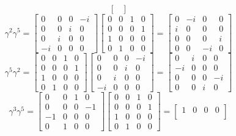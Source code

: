 \documentclass{article}
\begin{document}
\begin{flushleft}
$$\begin{bmatrix}
\end{bmatrix}
$$
$$
\gamma^{2} \gamma^{5}=\begin{bmatrix}
0 & 0 & 0 & -i \\
0 & 0 & i & 0 \\
0 & i & 0 & 0 \\
-i & 0 & 0 & 0
\end{bmatrix}\begin{bmatrix}
0 & 0 & 1 & 0 \\
0 & 0 & 0 & 1 \\
1 & 0 & 0 & 0 \\
0 & 1 & 0 & 0
\end{bmatrix}=\begin{bmatrix}
0 & -i & 0 & 0 \\
i & 0 & 0 & 0 \\
0 & 0 & 0 & i \\
0 & 0 & -i & 0
\end{bmatrix}
$$
$$
\gamma^{5} \gamma^{2}=\begin{bmatrix}
0 & 0 & 1 & 0 \\
0 & 0 & 0 & 1 \\
1 & 0 & 0 & 0 \\
0 & 1 & 0 & 0
\end{bmatrix}\begin{bmatrix}
0 & 0 & 0 & -i \\
0 & 0 & i & 0 \\
0 & i & 0 & 0 \\
-i & 0 & 0 & 0
\end{bmatrix}=\begin{bmatrix}
0 & i & 0 & 0 \\
-i & 0 & 0 & 0 \\
0 & 0 & 0 & -i \\
0 & 0 & i & 0
\end{bmatrix}
$$
$$
\gamma^{3} \gamma^{5}=\begin{bmatrix}
0 & 0 & 1 & 0 \\
0 & 0 & 0 & -1 \\
-1 & 0 & 0 & 0 \\
0 & 1 & 0 & 0
\end{bmatrix}\begin{bmatrix}
0 & 0 & 1 & 0 \\
0 & 0 & 0 & 1 \\
1 & 0 & 0 & 0 \\
0 & 1 & 0 & 0
\end{bmatrix}=\begin{bmatrix}
1 & 0 & 0 & 0 \\

\end{bmatrix}$$
\end{flushleft}
\end{document}

